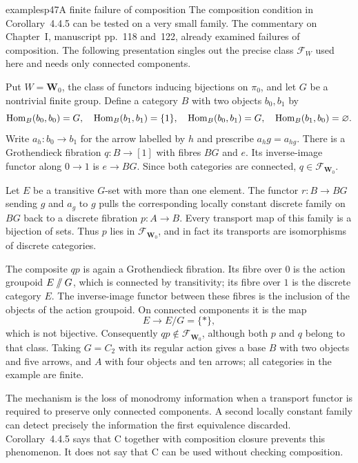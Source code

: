 \begin{dcomment}{examples}{p47}{A finite failure of composition}
The composition condition in Corollary~4.4.5 can be tested on a very small family. The commentary on Chapter~I, manuscript pp.~118 and~122, already examined failures of composition. The following presentation singles out the precise class $\mathcal F_W$ used here and needs only connected components.

Put $W=\mathbf W_0$, the class of functors inducing bijections on $\pi_0$, and let $G$ be a nontrivial finite group. Define a category $B$ with two objects $b_0,b_1$ by
\[
 \operatorname{Hom}_B(b_0,b_0)=G,\quad \operatorname{Hom}_B(b_1,b_1)=\{1\},\quad
 \operatorname{Hom}_B(b_0,b_1)=G,\quad \operatorname{Hom}_B(b_1,b_0)=\varnothing.
\]
Write $a_h:b_0\to b_1$ for the arrow labelled by $h$ and prescribe $a_hg=a_{hg}$. There is a Grothendieck fibration $q:B\to[1]$ with fibres $BG$ and $e$. Its inverse-image functor along $0\to1$ is $e\to BG$. Since both categories are connected, $q\in\mathcal F_{\mathbf W_0}$.

Let $E$ be a transitive $G$-set with more than one element. The functor $r:B\to BG$ sending $g$ and $a_g$ to $g$ pulls the corresponding locally constant discrete family on $BG$ back to a discrete fibration $p:A\to B$. Every transport map of this family is a bijection of sets. Thus $p$ lies in $\mathcal F_{\mathbf W_0}$, and in fact its transports are isomorphisms of discrete categories.

The composite $qp$ is again a Grothendieck fibration. Its fibre over $0$ is the action groupoid $E\mathbin{/\mkern-6mu/}G$, which is connected by transitivity; its fibre over $1$ is the discrete category $E$. The inverse-image functor between these fibres is the inclusion of the objects of the action groupoid. On connected components it is the map
\[
 E\longrightarrow E/G=\{*\},
\]
which is not bijective. Consequently $qp\notin\mathcal F_{\mathbf W_0}$, although both $p$ and $q$ belong to that class. Taking $G=C_2$ with its regular action gives a base $B$ with two objects and five arrows, and $A$ with four objects and ten arrows; all categories in the example are finite.

The mechanism is the loss of monodromy information when a transport functor is required to preserve only connected components. A second locally constant family can detect precisely the information the first equivalence discarded. Corollary~4.4.5 says that C together with composition closure prevents this phenomenon. It does not say that C can be used without checking composition.
\end{dcomment}


